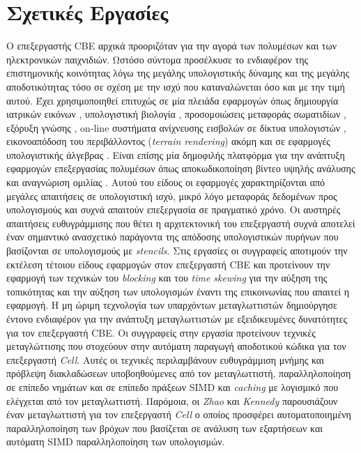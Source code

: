 \section{Σχετικές Εργασίες}
\label{section:sect43}
\indent
Ο επεξεργαστής \ac{CBE} αρχικά προοριζόταν για την αγορά των πολυμέσων και των ηλεκτρονικών παιχνιδιών. Ωστόσο σύντομα προσέλκυσε το ενδιαφέρον της επιστημονικής κοινότητας λόγω της μεγάλης υπολογιστικής δύναμης και της μεγάλης αποδοτικότητας τόσο σε σχέση με την ισχύ που καταναλώνεται όσο και με την τιμή αυτού.\newline \indent
Έχει χρησιμοποιηθεί επιτυχώς σε μία πλειάδα εφαρμογών όπως δημιουργία ιατρικών εικόνων \cite{Knaupetal07}, υπολογιστική βιολογία \cite{Sachdeva07}, προσομοιώσεις μεταφοράς σωματιδίων \cite{Petrini07}, εξόρυξη γνώσης \cite{BaderAgarwalMadduri07, BuehrerParthasarathyGoyder08}, on-line συστήματα ανίχνευσης εισβολών σε δίκτυα υπολογιστών \cite{ScarpazzaVillaPetrini07}, εικονοαπόδοση του περιβάλλοντος (\textsl{terrain rendering}) \cite{TRE} ακόμη και σε εφαρμογές υπολογιστικής άλγεβρας \cite{linpack}. Είναι επίσης μία δημοφιλής πλατφόρμα για την ανάπτυξη εφαρμογών επεξεργασίας πολυμέσων όπως αποκωδικοποίηση βίντεο υψηλής ανάλυσης \cite{BaikSihnKim07} και αναγνώριση ομιλίας \cite{Liu07}. Αυτού του είδους οι εφαρμογές χαρακτηρίζονται από μεγάλες απαιτήσεις σε υπολογιστική ισχύ, μικρό λόγο μεταφοράς δεδομένων προς υπολογισμούς και συχνά απαιτούν επεξεργασία σε πραγματικό χρόνο.\newline \indent
Οι αυστηρές απαιτήσεις ευθυγράμμισης που θέτει η αρχιτεκτονική του επεξεργαστή συχνά αποτελεί έναν σημαντικό ανασχετικό παράγοντα της απόδοσης υπολογιστικών πυρήνων που βασίζονται σε υπολογισμούς με \textsl{stencils}. Στις εργασίες \cite{KamilDattaetal06, WilliamsShalf06} οι συγγραφείς αποτιμούν την εκτέλεση τέτοιου είδους εφαρμογών στον επεξεργαστή \ac{CBE} και προτείνουν την εφαρμογή των τεχνικών του \textsl{blocking} και του \textsl{time skewing} \cite{Wonnacott00} για την αύξηση της τοπικότητας και την αύξηση των υπολογισμών έναντι της επικοινωνίας που απαιτεί η εφαρμογή.\newline \indent
Η μη ώριμη τεχνολογία των υπαρχόντων μεταγλωττιστών δημιούργησε έντονο ενδιαφέρον για την ανάπτυξη μεταγλωττιστών με εξειδικευμένες δυνατότητες για τον επεξεργαστή \ac{CBE}. Οι συγγραφείς στην εργασία \cite{Eichenbergeretal06} προτείνουν τεχνικές μεταγλώττισης που στοχεύουν στην αυτόματη παραγωγή αποδοτικού κώδικα για τον επεξεργαστή \textsl{Cell}. Αυτές οι τεχνικές περιλαμβάνουν ευθυγράμμιση μνήμης και πρόβλεψη διακλαδώσεων υποβοηθούμενες από τον μεταγλωττιστή, παραλληλοποίηση σε επίπεδο νημάτων και σε επίπεδο πράξεων \ac{SIMD} και \textsl{caching} με λογισμικό που ελέγχεται από τον μεταγλωττιστή. Παρόμοια, οι \textsl{Zhao} και \textsl{Kennedy} \cite{ZhaoKennedy06} παρουσιάζουν έναν μεταγλωττιστή για τον επεξεργαστή \textsl{Cell} ο οποίος προσφέρει αυτοματοποιημένη παραλληλοποίηση των βρόχων που βασίζεται σε ανάλυση των εξαρτήσεων και αυτόματη \ac{SIMD} παραλληλοποίηση των υπολογισμών.
